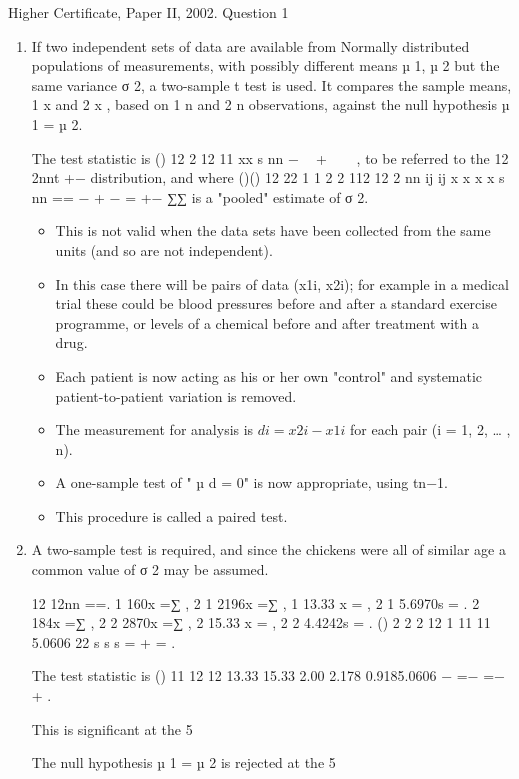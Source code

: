 \documentclass[a4paper,12pt]{article}
\begin{document}
Higher Certificate, Paper II, 2002.  Question 1 
 
\begin{enumerate} 
\item If two independent sets of data are available from Normally distributed populations of measurements, with possibly different means µ 1, µ 2 but the same variance σ
 2, a two-sample t test is used.  It compares the sample means, 1 x and 2 x , based on 1 n and 2 n observations, against the null hypothesis µ 1 = µ 2. 
 
The test statistic is 
 () 12
2
12 11 xx
s
nn
−  +   ,  to be referred to the 12 2nnt +− distribution, and where 
 ()() 12 22 1 1 2 2 112
12 2
nn
ij ij x x x x
s
nn == − + −
=
+− ∑∑  is a "pooled" estimate of σ
 2. 
 \begin{itemize}
     \item  This is not valid when the data sets have been collected from the same units (and so are not independent). 
     \item In this case there will be pairs of data (x1i, x2i);  for example in a medical trial these could be blood pressures before and after a standard exercise programme, or levels of a chemical before and after treatment with a drug. 
     \item Each patient is now acting as his or her own "control" and systematic patient-to-patient variation is removed. 
     \item The measurement for analysis is $di = x2i − x1i$ for each pair (i = 1, 2, … , n).  \item A one-sample test of " µ d = 0" is now appropriate, using tn−1.  
     
     \item This procedure is called a paired test. 
 \end{itemize}

 
\item  A two-sample test is required, and since the chickens were all of similar age a common value of σ 2 may be assumed. 
 
12 12nn ==. 
 1 160x =∑ ,   2 1 2196x =∑ ,   1 13.33 x = ,   2 1 5.6970s = . 
 2 184x =∑ ,   2 2 2870x =∑ ,   2 15.33 x = ,   2 2 4.4242s = . 
 () 2 2 2 12 1 11 11 5.0606 22 s s s = + = . 
 
The test statistic is 
() 11 12 12 13.33 15.33 2.00 2.178 0.9185.0606 − =− =− +
. 
 
This is significant at the 5%
 
The null hypothesis µ 1 = µ 2 is rejected at the 5%

\end{enumerate}
\end{document}
